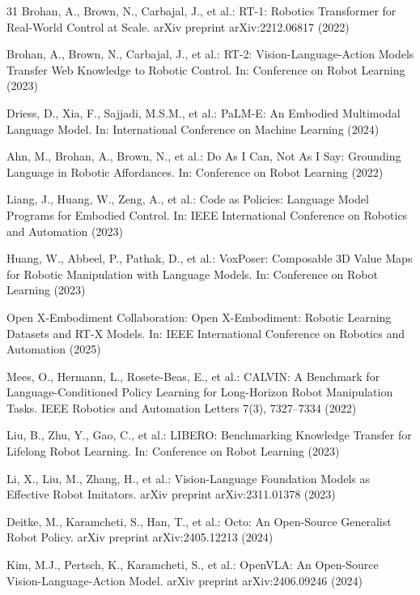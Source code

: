 \documentclass[a4paper]{Template/LaTeX_Templates/waica}
\begin{document}
\begin{thebibliography}{31}
Brohan, A., Brown, N., Carbajal, J., et al.: RT-1: Robotics Transformer for Real-World Control at Scale. arXiv preprint arXiv:2212.06817 (2022)

Brohan, A., Brown, N., Carbajal, J., et al.: RT-2: Vision-Language-Action Models Transfer Web Knowledge to Robotic Control. In: Conference on Robot Learning (2023)

Driess, D., Xia, F., Sajjadi, M.S.M., et al.: PaLM-E: An Embodied Multimodal Language Model. In: International Conference on Machine Learning (2024)

Ahn, M., Brohan, A., Brown, N., et al.: Do As I Can, Not As I Say: Grounding Language in Robotic Affordances. In: Conference on Robot Learning (2022)

Liang, J., Huang, W., Zeng, A., et al.: Code as Policies: Language Model Programs for Embodied Control. In: IEEE International Conference on Robotics and Automation (2023)

Huang, W., Abbeel, P., Pathak, D., et al.: VoxPoser: Composable 3D Value Maps for Robotic Manipulation with Language Models. In: Conference on Robot Learning (2023)

Open X-Embodiment Collaboration: Open X-Embodiment: Robotic Learning Datasets and RT-X Models. In: IEEE International Conference on Robotics and Automation (2025)

Mees, O., Hermann, L., Rosete-Beas, E., et al.: CALVIN: A Benchmark for Language-Conditioned Policy Learning for Long-Horizon Robot Manipulation Tasks. IEEE Robotics and Automation Letters 7(3), 7327--7334 (2022)

Liu, B., Zhu, Y., Gao, C., et al.: LIBERO: Benchmarking Knowledge Transfer for Lifelong Robot Learning. In: Conference on Robot Learning (2023)

Li, X., Liu, M., Zhang, H., et al.: Vision-Language Foundation Models as Effective Robot Imitators. arXiv preprint arXiv:2311.01378 (2023)

Deitke, M., Karamcheti, S., Han, T., et al.: Octo: An Open-Source Generalist Robot Policy. arXiv preprint arXiv:2405.12213 (2024)

Kim, M.J., Pertsch, K., Karamcheti, S., et al.: OpenVLA: An Open-Source Vision-Language-Action Model. arXiv preprint arXiv:2406.09246 (2024)


\end{thebibliography}
\end{document}
